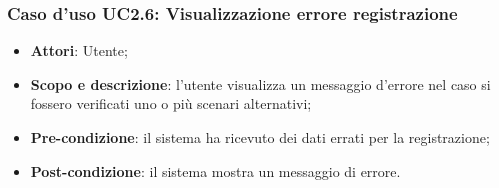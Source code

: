 \subsubsection{Caso d'uso UC2.6: Visualizzazione errore registrazione}
\begin{itemize}
\item \textbf{Attori}: Utente;
\item \textbf{Scopo e descrizione}: l'utente visualizza un messaggio d'errore nel caso si fossero verificati uno o più scenari alternativi;
\item \textbf{Pre-condizione}: il sistema ha ricevuto dei dati errati per la registrazione;
\item \textbf{Post-condizione}: il sistema mostra un messaggio di errore.
\end{itemize}
